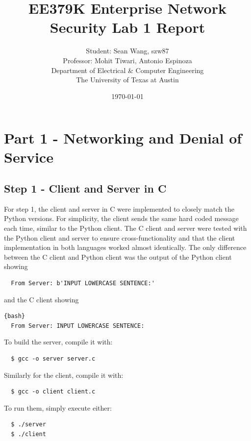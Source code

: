 \documentclass[11pt]{article}
\author{Student: Sean Wang, szw87 \\ Professor: Mohit Tiwari, Antonio Espinoza \\ Department of Electrical \& Computer Engineering \\ The University of Texas at Austin}
\date{\today}
\title{EE379K Enterprise Network Security Lab 1 Report}
\begin{document}
\maketitle
\section*{Part 1 - Networking and Denial of Service}
\subsection*{Step 1 - Client and Server in C}
For step 1, the client and server in C were implemented to closely match the Python versions.
For simplicity, the client sends the same hard coded message each time, similar to the Python
client. The C client and server were tested with the Python client and server to ensure
cross-functionality and that the client implementation in both languages worked almost
identically. The only difference between the C client and Python client was the output of the
Python client showing
\begin{verbatim}
  From Server: b'INPUT LOWERCASE SENTENCE:'
\end{verbatim}
and the C client showing
\begin{verbatim}{bash}
  From Server: INPUT LOWERCASE SENTENCE:
\end{verbatim}
To build the server, compile it with:
\begin{verbatim}
  $ gcc -o server server.c
\end{verbatim}
Similarly for the client, compile it with:
\begin{verbatim}
  $ gcc -o client client.c
\end{verbatim}
To run them, simply execute either:
\begin{verbatim}
  $ ./server
  $ ./client
\end{verbatim}
\end{document}
